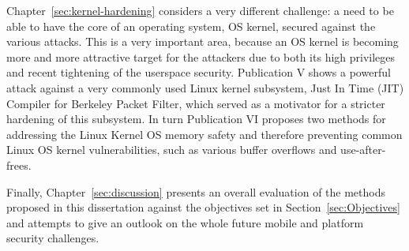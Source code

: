 Chapter~\ref{sec:kernel-hardening} considers a very different challenge: a need to be able to have the core of an operating system, OS kernel, secured against the various attacks. This is a very important area, because an OS kernel is becoming more and more attractive target for the attackers due to both its high privileges and recent tightening of the userspace security. Publication V shows a powerful attack against a very commonly used Linux kernel subsystem, Just In Time (JIT) Compiler for Berkeley Packet Filter, which served as a motivator for a stricter hardening of this subsystem. In turn Publication VI proposes two methods for addressing the Linux Kernel OS memory safety and therefore preventing common Linux OS kernel vulnerabilities, such as various buffer overflows and use-after-frees. 

Finally, Chapter~\ref{sec:discussion} presents an overall evaluation of the methods proposed in this dissertation against the objectives set in Section~\ref{sec:Objectives} and attempts to give an outlook on the whole future mobile and platform security challenges. 

